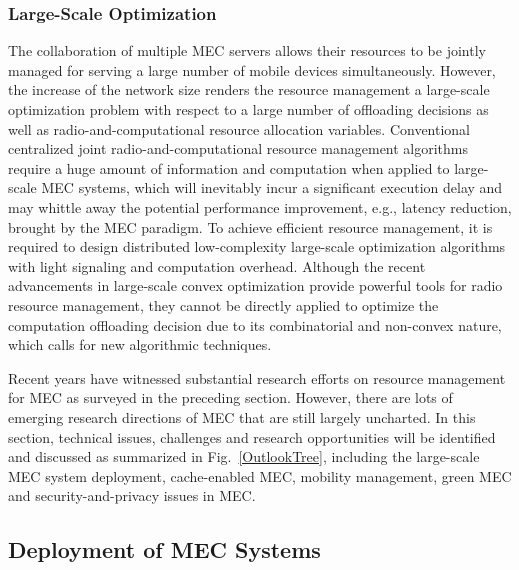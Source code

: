 \documentclass[journal]{IEEEtran}
\begin{document}
{\subsubsection{\textbf{Large-Scale Optimization}} The collaboration of multiple MEC servers allows their resources to be jointly managed for serving a large number of mobile devices simultaneously. However, the increase of the network size renders the resource management a large-scale optimization problem with respect to a large number of offloading decisions as well as radio-and-computational resource allocation variables. {\color{black}Conventional centralized joint radio-and-computational resource management algorithms require a huge amount of information and computation when applied to large-scale MEC systems, which will inevitably incur a significant execution delay and may whittle away the potential performance improvement, e.g., latency reduction, brought by the MEC paradigm. To achieve efficient resource management, it is required  to design distributed low-complexity large-scale optimization algorithms with light signaling and computation overhead.} Although the recent advancements in large-scale convex optimization \cite{YShi1509} provide powerful tools for radio resource management, they cannot be directly applied to optimize the computation offloading decision due to its combinatorial and non-convex nature, which calls for new algorithmic techniques.

{}\label{Section:Others}


Recent years have witnessed substantial research efforts on resource management for MEC as surveyed in the preceding section. However, there are lots of emerging research directions of MEC  that are still largely uncharted. In this section, technical issues, challenges and research opportunities will be identified and discussed as summarized in Fig.~\ref{OutlookTree}, including the large-scale MEC system deployment, cache-enabled MEC, mobility management, green MEC and security-and-privacy issues in MEC.

\subsection{Deployment of MEC Systems}

}
\end{document}
